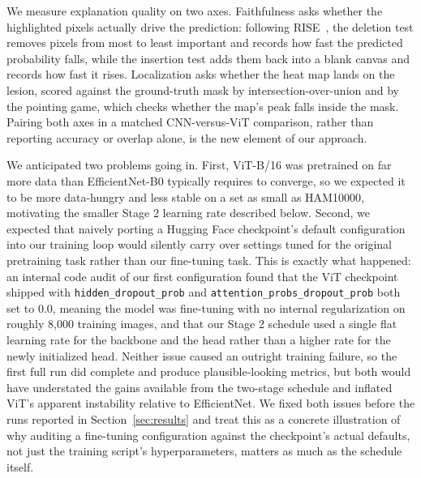 \documentclass[10pt,twocolumn,letterpaper]{article}
\begin{document}
We measure explanation quality on two axes. Faithfulness asks whether the
highlighted pixels actually drive the prediction: following
RISE~\cite{petsiuk2018rise}, the deletion test removes pixels from most to least
important and records how fast the predicted probability falls, while the
insertion test adds them back into a blank canvas and records how fast it rises.
Localization asks whether the heat map lands on the lesion, scored against the
ground-truth mask by intersection-over-union and by the pointing game, which
checks whether the map's peak falls inside the mask. Pairing both axes in a
matched CNN-versus-ViT comparison, rather than reporting accuracy or overlap
alone, is the new element of our approach.

We anticipated two problems going in. First, ViT-B/16 was pretrained on far more
data than EfficientNet-B0 typically requires to converge, so we expected it to
be more data-hungry and less stable on a set as small as HAM10000, motivating
the smaller Stage 2 learning rate described below. Second, we expected that
naively porting a Hugging Face checkpoint's default configuration into our
training loop would silently carry over settings tuned for the original
pretraining task rather than our fine-tuning task. This is exactly what
happened: an internal code audit of our first configuration found that the ViT
checkpoint shipped with \texttt{hidden\_dropout\_prob} and
\texttt{attention\_probs\_dropout\_prob} both set to $0.0$, meaning the model was
fine-tuning with no internal regularization on roughly 8,000 training images,
and that our Stage 2 schedule used a single flat learning rate for the backbone
and the head rather than a higher rate for the newly initialized head. Neither
issue caused an outright training failure, so the first full run did complete
and produce plausible-looking metrics, but both would have understated the
gains available from the two-stage schedule and inflated ViT's apparent
instability relative to EfficientNet. We fixed both issues before the runs
reported in Section~\ref{sec:results} and treat this as a concrete illustration
of why auditing a fine-tuning configuration against the checkpoint's actual
defaults, not just the training script's hyperparameters, matters as much as
the schedule itself.
\end{document}
